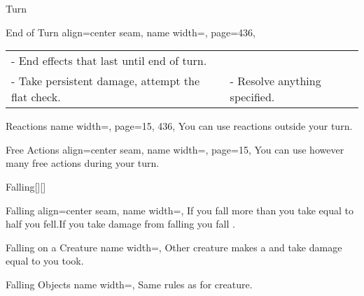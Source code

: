 \begin{PageBack}
\begin{Tables}{\backTableHeight}
\begin{Table}{Turn}
\begin{entry}{End of Turn}{%
                align=center seam,
                name width=\turnLength,%
                page=436,
            }
\begin{tabular}{@{}ll}
                    - End effects that last until end of turn. \\%
                    - Take persistent damage, attempt the flat check. &
                    - Resolve anything specified.
                \end{tabular}%
            \end{entry}
            \begin{entry}{Reactions}{%
                name width=\turnLength,%
                page={15, 436},
            }
                You can use reactions  outside your turn. \hfill {}
            \end{entry}
            \begin{entry}{Free Actions}{%
                align=center seam,
                name width=\turnLength,%
                page=15,
            }
                You can use however many free actions during your turn. \hfill {}
            \end{entry}
        \end{Table}\TableSpace
        \begin{Table}{Falling}[][]
            \begin{entry}{Falling}{%
                align=center seam,
                name width=\turnLength,}
                If you fall more than  \Feet you take  equal
                to half you
                fell.\hfill If you take damage from falling you fall \Prone.\\
            \end{entry}
            \begin{entry}{Falling on a Creature}{%
                name width=\turnLength,}
                Other creature makes a \Reflex[][val=15] and take damage equal
                to     you took.
            \end{entry}
            \begin{entry}{Falling Objects}{%
                name width=\turnLength,}
                Same rules as for creature. \hfill {}
\end{entry}
\end{Table}
\end{Tables}
\end{PageBack}
